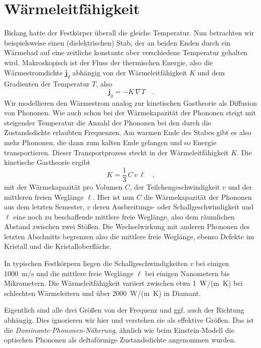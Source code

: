      

\section*{Wärmeleitfähigkeit}

 Bislang hatte der Festkörper überall die gleiche Temperatur. Nun betrachten wir beispielsweise einen (dielektrischen) Stab, der an beiden Enden durch ein Wärmebad auf eine zeitliche konstante aber verschiedene Temperatur gehalten wird. Makroskopisch ist der Fluss der thermischen Energie, also die Wärmestromdichte $\mathbf{j}_q$ abhängig von der Wärmeleitfähigkeit $K$ und dem Gradienten der Temperatur $T$, also
\begin{equation}
    \mathbf{j}_q = - K \, \nabla T \quad .
\end{equation}
Wir modellieren den Wärmestrom analog zur kinetischen Gastheorie  als Diffusion von Phononen. Wie auch schon bei der Wärmekapazität der Phononen steigt mit steigender Temperatur die Anzahl der Phononen bei den durch die Zustandsdichte erlaubten Frequenzen. Am warmen Ende des Stabes gibt es also mehr Phononen, die dann zum kalten Ende gelangen und so Energie transportieren. Dieser Transportprozess steckt in der Wärmeleitfähigkeit $K$. Die kinetische Gastheorie  ergibt
\begin{equation}
    K  = \frac{1}{3} \, C \, v \, \ell \quad , \label{eq:2_def_waermeleitf}
\end{equation}
mit der Wärmekapazität pro Volumen $C$, der Teilchengeschwindigkeit $v$ und der mittleren freien Weglänge $\ell$. Hier ist nun $C$ die Wärmekapazität der Phononen aus dem letzten Semester, $v$ deren Ausbreitungs- oder Schallgeschwindigkeit und $\ell$ eine noch zu beschaffende mittlere freie Weglänge, also dem räumlichen Abstand zwischen zwei Stößen. Die Wechselwirkung mit anderen Phononen des letzten Abschnitts begrenzen also die mittlere freie Weglänge, ebenso Defekte im Kristall und die Kristalloberfläche.

In typischen Festkörpern liegen die Schallgeschwindigkeiten $v$ bei einigen 1000~m/s und die mittlere freie Weglänge  $\ell$ bei einigen Nanometern bis Mikrometern. Die Wärmeleitfähigkeit variiert zwischen etwa 1~W/(m~K) bei schlechten Wärmeleitern und über 2000~W/(m~K) in Diamant.

Eigentlich sind alle drei Größen von der Frequenz und ggf. auch der Richtung abhängig. Dies ignorieren wir hier und verstehen sie als effektive Größen. Das ist die \emph{Dominante-Phononen-Näherung}, ähnlich wie beim Einstein-Modell die optischen Phononen als deltaförmige Zustandsdichte angenommen wurden.



